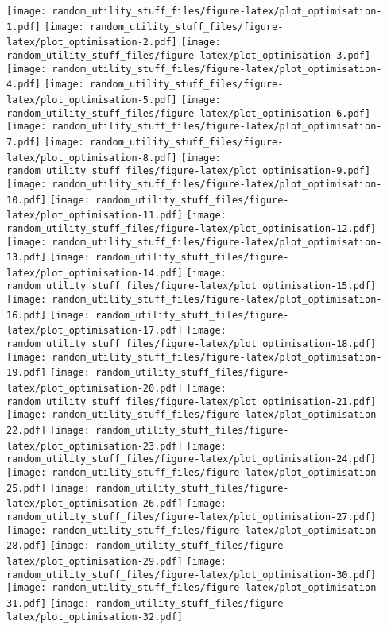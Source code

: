 \documentclass[]{article}
\begin{document}
\texttt{[image: random\_utility\_stuff\_files/figure-latex/plot\_optimisation-1.pdf]}
\texttt{[image: random\_utility\_stuff\_files/figure-latex/plot\_optimisation-2.pdf]}
\texttt{[image: random\_utility\_stuff\_files/figure-latex/plot\_optimisation-3.pdf]}
\texttt{[image: random\_utility\_stuff\_files/figure-latex/plot\_optimisation-4.pdf]}
\texttt{[image: random\_utility\_stuff\_files/figure-latex/plot\_optimisation-5.pdf]}
\texttt{[image: random\_utility\_stuff\_files/figure-latex/plot\_optimisation-6.pdf]}
\texttt{[image: random\_utility\_stuff\_files/figure-latex/plot\_optimisation-7.pdf]}
\texttt{[image: random\_utility\_stuff\_files/figure-latex/plot\_optimisation-8.pdf]}
\texttt{[image: random\_utility\_stuff\_files/figure-latex/plot\_optimisation-9.pdf]}
\texttt{[image: random\_utility\_stuff\_files/figure-latex/plot\_optimisation-10.pdf]}
\texttt{[image: random\_utility\_stuff\_files/figure-latex/plot\_optimisation-11.pdf]}
\texttt{[image: random\_utility\_stuff\_files/figure-latex/plot\_optimisation-12.pdf]}
\texttt{[image: random\_utility\_stuff\_files/figure-latex/plot\_optimisation-13.pdf]}
\texttt{[image: random\_utility\_stuff\_files/figure-latex/plot\_optimisation-14.pdf]}
\texttt{[image: random\_utility\_stuff\_files/figure-latex/plot\_optimisation-15.pdf]}
\texttt{[image: random\_utility\_stuff\_files/figure-latex/plot\_optimisation-16.pdf]}
\texttt{[image: random\_utility\_stuff\_files/figure-latex/plot\_optimisation-17.pdf]}
\texttt{[image: random\_utility\_stuff\_files/figure-latex/plot\_optimisation-18.pdf]}
\texttt{[image: random\_utility\_stuff\_files/figure-latex/plot\_optimisation-19.pdf]}
\texttt{[image: random\_utility\_stuff\_files/figure-latex/plot\_optimisation-20.pdf]}
\texttt{[image: random\_utility\_stuff\_files/figure-latex/plot\_optimisation-21.pdf]}
\texttt{[image: random\_utility\_stuff\_files/figure-latex/plot\_optimisation-22.pdf]}
\texttt{[image: random\_utility\_stuff\_files/figure-latex/plot\_optimisation-23.pdf]}
\texttt{[image: random\_utility\_stuff\_files/figure-latex/plot\_optimisation-24.pdf]}
\texttt{[image: random\_utility\_stuff\_files/figure-latex/plot\_optimisation-25.pdf]}
\texttt{[image: random\_utility\_stuff\_files/figure-latex/plot\_optimisation-26.pdf]}
\texttt{[image: random\_utility\_stuff\_files/figure-latex/plot\_optimisation-27.pdf]}
\texttt{[image: random\_utility\_stuff\_files/figure-latex/plot\_optimisation-28.pdf]}
\texttt{[image: random\_utility\_stuff\_files/figure-latex/plot\_optimisation-29.pdf]}
\texttt{[image: random\_utility\_stuff\_files/figure-latex/plot\_optimisation-30.pdf]}
\texttt{[image: random\_utility\_stuff\_files/figure-latex/plot\_optimisation-31.pdf]}
\texttt{[image: random\_utility\_stuff\_files/figure-latex/plot\_optimisation-32.pdf]}
\end{document}
